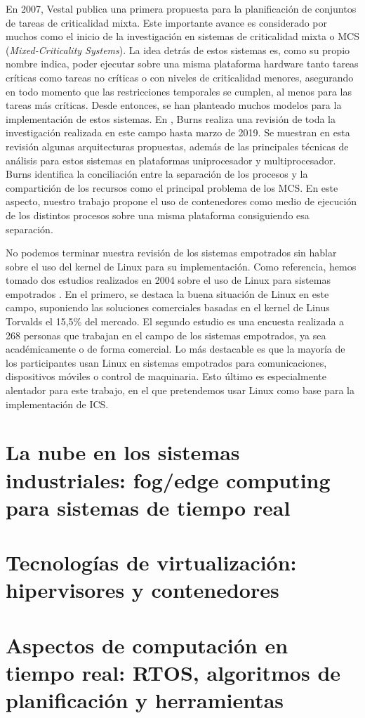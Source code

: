 En 2007, Vestal \cite{vestal_preemptive_2007} publica una primera propuesta para
la planificación de conjuntos de tareas de criticalidad mixta. Este importante
avance es considerado por muchos como el inicio de la investigación en sistemas
de criticalidad mixta o MCS (\textit{Mixed-Criticality Systems}). La idea detrás
de estos sistemas es, como su propio nombre indica, poder ejecutar sobre una
misma plataforma hardware tanto tareas críticas como tareas no críticas o con
niveles de criticalidad menores, asegurando en todo momento que las
restricciones temporales se cumplen, al menos para las tareas más críticas.
Desde entonces, se han planteado muchos modelos para la implementación de estos
sistemas. En \cite{burns_mixed_2015}, Burns realiza una revisión de toda la
investigación realizada en este campo hasta marzo de 2019. Se muestran en esta
revisión algunas arquitecturas propuestas, además de las principales técnicas de
análisis para estos sistemas en plataformas uniprocesador y multiprocesador.
Burns identifica la conciliación entre la separación de los procesos y la
compartición de los recursos como el principal problema de los MCS. En este
aspecto, nuestro trabajo propone el uso de contenedores como medio de ejecución
de los distintos procesos sobre una misma plataforma consiguiendo esa
separación.

No podemos terminar nuestra revisión de los sistemas empotrados sin hablar sobre
el uso del kernel de Linux para su implementación. Como referencia, hemos tomado
dos estudios realizados en 2004 sobre el uso de Linux para sistemas empotrados
\cite{geer_survey_2004}\cite{henkel_munichmit_2004}. En el primero, se destaca
la buena situación de Linux en este campo, suponiendo las soluciones comerciales
basadas en el kernel de Linus Torvalds el 15,5\% del mercado. El segundo estudio
es una encuesta realizada a 268 personas que trabajan en el campo de los
sistemas empotrados, ya sea académicamente o de forma comercial. Lo más
destacable es que la mayoría de los participantes usan Linux en sistemas
empotrados para comunicaciones, dispositivos móviles o control de maquinaria.
Esto último es especialmente alentador para este trabajo, en el que pretendemos
usar Linux como base para la implementación de ICS.

\section{La nube en los sistemas industriales: fog/edge computing para sistemas
  de tiempo real}

\section{Tecnologías de virtualización: hipervisores y contenedores}

\section{Aspectos de computación en tiempo real: RTOS, algoritmos de
  planificación y herramientas}
\label{sec:real-time}
